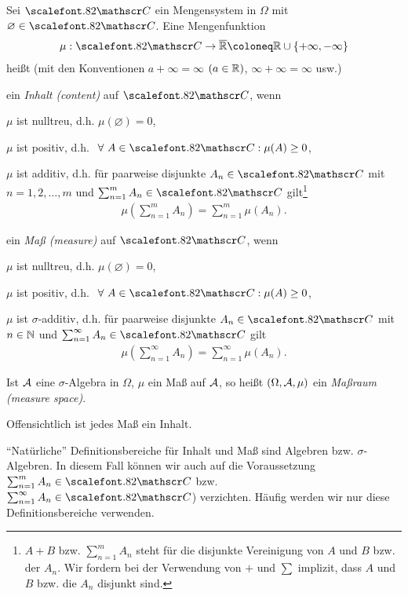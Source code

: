 \begin{defn}
\label{defn:1.5}
Sei $\CC$ ein Mengensystem in $\Omega $ mit
$\varnothing \in \CC$. Eine Mengenfunktion 
\begin{align*}
\mu : \CC \to
\overline{\R} \defl \R \cup \{+ \infty, - \infty\}
\end{align*}
heißt (mit den Konventionen
$a+\infty = \infty$ $(a \in \R)$, $\infty + \infty = \infty $ usw.)
\begin{defnenum}
\item ein \emph{Inhalt (content)} auf $\CC$, wenn
\begin{defnpropenum}
\item $\mu$ ist nulltreu, d.h. $\mu(\varnothing) = 0$,
\item $\mu$ ist positiv, d.h. $\forall A \in \CC : \mu
  (A) \geq 0 $,
\item $\mu $ ist additiv, d.h. für paarweise disjunkte $ A_{n} \in
{\CC}$ mit $n=1,2,\ldots,m$ und $\sum^{m}_{n=1} A_{n}\in \CC$
 gilt\footnote{
$A+B$ bzw. $\sum_{n=1}^m A_n$ steht für die disjunkte
Vereinigung von $A$ und $B$ bzw. der $A_n$. Wir fordern bei der Verwendung von
$+$ und $\sum$ implizit, dass $A$ und $B$ bzw. die $A_n$ disjunkt sind.
}
\begin{align*}
\mu\left(\sum^{m}_{n=1} A_{n}\right) = \sum^{m}_{n=1} \mu(A_{n}).
\end{align*}
\end{defnpropenum}
\item
ein \emph{Maß (measure)} auf $\CC$, wenn
\begin{defnpropenum}
\item $\mu$ ist nulltreu, d.h. $\mu (\varnothing)= 0$,
\item $\mu$ ist positiv, d.h. $\forall A \in \CC : \mu
  (A) \geq 0 $,
\item $\mu $ ist $\sigma$-additiv, d.h. für paarweise disjunkte $ A_{n}
\in \CC$ mit $n\in\N$ und $\sum^{\infty}_{n=1} A_{n}\in \CC$
  gilt
\begin{align*}
\mu \left(\sum^{\infty}_{n=1} A_{n}\right) = \sum^{\infty}_{n=1}\mu(A_{n}).
\end{align*}
\end{defnpropenum}
\end{defnenum}
Ist $\AA$ eine $\sigma$-Algebra in $\Omega$, $\mu $
ein Maß auf $\AA$, so heißt $(\Omega, \AA, \mu )$ ein \emph{Maßraum
(measure space)}.\fishhere
\end{defn}
Offensichtlich ist jedes Maß ein Inhalt.

``Natürliche'' Definitionsbereiche für Inhalt und Maß sind Algebren
bzw. $\sigma$-Algebren. In diesem Fall können wir auch auf die Voraussetzung
$\sum^{m}_{n=1}A_{n} \in {\CC}$ bzw. $\sum^{\infty}_{n=1} A_{n} \in {\CC}$)
verzichten. Häufig werden wir nur diese Definitionsbereiche verwenden.

